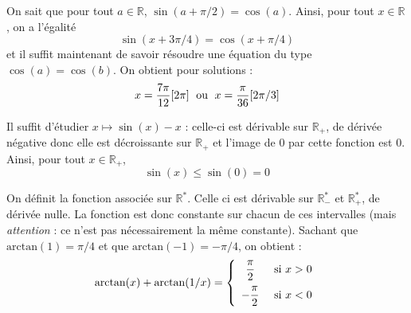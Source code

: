 \documentclass[a4paper,twoside,french,11pt]{VcCours}
\begin{document}
\begin{Exercice}{}\end{Exercice}On sait que pour tout $a \in \mathbb{R}$, $\sin \left(a + \pi /2 \right) = \cos(a)$. Ainsi, pour tout $x \in \mathbb{R}$, on a l'égalité 
$$\sin(x + {3\pi} / 4) = \cos(x  + {\pi} / 4)$$
et il suffit maintenant de savoir résoudre une équation du type $\cos(a)=\cos(b)$. On obtient pour solutions : 
$$x = \dfrac{7\pi}{12} [2 \pi] \; \hbox{ ou } \; x = \dfrac{\pi}{36} [2\pi/3]$$




\begin{Exercice}{}\end{Exercice}Il suffit d'étudier $x \mapsto \sin(x)-x$ : celle-ci est dérivable sur $\mathbb{R}_+$, de dérivée négative donc elle est décroissante sur $\mathbb{R}_+$ et l'image de $0$ par cette fonction est $0$. Ainsi, pour tout $x \in \mathbb{R}_+$,
$$ \sin(x) \leq \sin(0)=0$$


%
%




\begin{Exercice}{}\end{Exercice}On définit la fonction associée sur $\mathbb{R}^*$. Celle ci est dérivable sur $\mathbb{R}_{-}^*$ et $\mathbb{R}_{+}^*$, de dérivée nulle. La fonction est donc constante sur chacun de ces intervalles (mais \textit{attention} : ce n'est pas nécessairement la même constante). Sachant que $\textrm{arctan}(1)= \pi/4$ et que $\textrm{arctan}(-1)= - \pi/4$, on obtient :
$$ \textrm{arctan}(x)+ \textrm{arctan}(1/x) = \left\lbrace\begin{array}{cl}
\dfrac{\pi}{2} & \hbox{ si } x>0 \\[0.3cm]
-\dfrac{\pi}{2} & \hbox{ si } x<0 \\
\end{array}\right.$$


%

\begin{Exercice}{}\end{Exercice}
\end{document}

